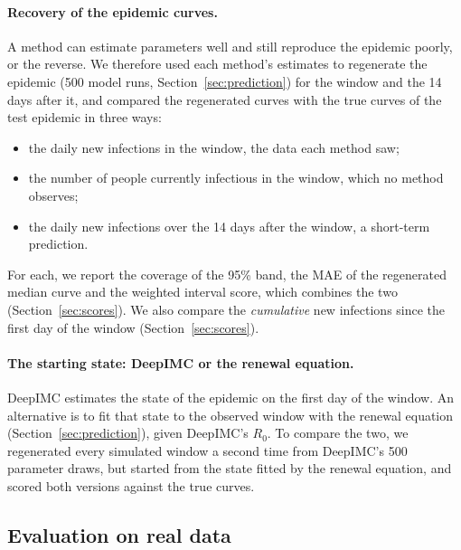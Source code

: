 \documentclass[12pt]{article}
\begin{document}
\paragraph{Recovery of the epidemic curves.} A method can estimate parameters well and still reproduce
the epidemic poorly, or the reverse. We therefore used each method's estimates to regenerate the epidemic
(500 model runs, Section~\ref{sec:prediction}) for the window and the 14 days after it, and compared the
regenerated curves with the true curves of the test epidemic in three ways:
\begin{itemize}[leftmargin=*]
\item the daily new infections in the window, the data each method saw;
\item the number of people currently infectious in the window, which no method observes;
\item the daily new infections over the 14 days after the window, a short-term prediction.
\end{itemize}
For each, we report the coverage of the 95\% band, the MAE of the regenerated median curve and the
weighted interval score, which combines the two (Section~\ref{sec:scores}). We also compare the
\emph{cumulative} new infections since the first day of the window (Section~\ref{sec:scores}).

\paragraph{The starting state: DeepIMC or the renewal equation.} DeepIMC estimates the state of the epidemic
on the first day of the window. An alternative is to fit that state to the observed window with the renewal
equation (Section~\ref{sec:prediction}), given DeepIMC's $R_0$. To compare the two, we regenerated every
simulated window a second time from DeepIMC's 500 parameter draws, but started from the state fitted by the
renewal equation, and scored both versions against the true curves.

\subsection{Evaluation on real data}\label{sec:eval-real}
\end{document}
